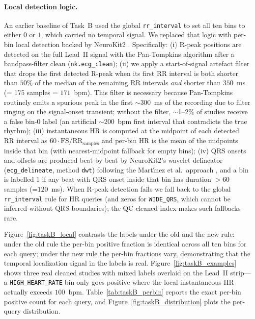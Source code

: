 \documentclass[12pt,letterpaper]{article}
\begin{document}
\paragraph{Local detection logic.} An earlier baseline of Task~B used the global \texttt{rr\_interval} to set all ten bins to either $0$ or $1$, which carried no temporal signal. We replaced that logic with per-bin local detection backed by NeuroKit2 \cite{makowski2021neurokit2}. Specifically: (i) R-peak positions are detected on the full Lead~II signal with the Pan-Tompkins algorithm \cite{pan1985realtime} after a bandpass-filter clean (\texttt{nk.ecg\_clean}); (ii) we apply a start-of-signal artefact filter that drops the first detected R-peak when its first RR interval is both shorter than $50\%$ of the median of the remaining RR intervals \emph{and} shorter than $350$~ms (= 175 samples = $171$~bpm). This filter is necessary because Pan-Tompkins routinely emits a spurious peak in the first $\sim$300~ms of the recording due to filter ringing on the signal-onset transient; without the filter, $\sim$1--2\% of studies receive a false bin-0 label (an artificial $\sim$200~bpm first interval that contradicts the true rhythm); (iii) instantaneous HR is computed at the midpoint of each detected RR interval as $60\cdot \mathrm{FS}/\text{RR}_{\text{samples}}$ and per-bin HR is the mean of the midpoints inside that bin (with nearest-midpoint fallback for empty bins); (iv) QRS onsets and offsets are produced beat-by-beat by NeuroKit2's wavelet delineator (\texttt{ecg\_delineate}, method \texttt{dwt}) following the Mart\'{\i}nez et al.\ approach \cite{martinez2004wavelet}, and a bin is labelled $1$ if any beat with QRS onset inside that bin has duration $>60$ samples (=$120$~ms). When R-peak detection fails we fall back to the global \texttt{rr\_interval} rule for HR queries (and zeros for \texttt{WIDE\_QRS}, which cannot be inferred without QRS boundaries); the QC-cleaned index makes such fallbacks rare.

Figure~\ref{fig:taskB_local} contrasts the labels under the old and the new rule: under the old rule the per-bin positive fraction is identical across all ten bins for each query; under the new rule the per-bin fractions vary, demonstrating that the temporal localization signal in the labels is real. Figure~\ref{fig:taskB_examples} shows three real cleaned studies with mixed labels overlaid on the Lead~II strip---a \texttt{HIGH\_HEART\_RATE} bin only goes positive where the local instantaneous HR actually exceeds $100$~bpm. Table~\ref{tab:taskB_perbin} reports the exact per-bin positive count for each query, and Figure~\ref{fig:taskB_distribution} plots the per-query distribution.
\end{document}
